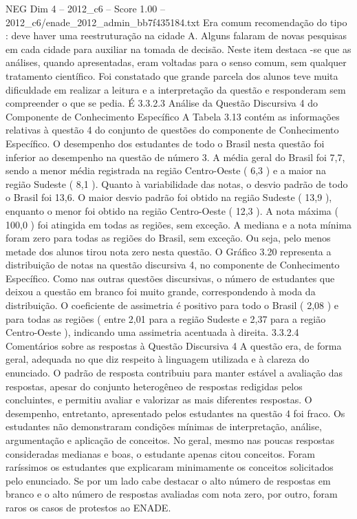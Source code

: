 \begin{textsample}{NEG Dim 4 – 2012\_c6 – Score 1.00 – 2012\_c6/enade\_2012\_admin\_bb7f435184.txt}
Era comum recomendação do tipo : deve haver uma reestruturação na cidade A.
Alguns falaram de novas pesquisas em cada cidade para auxiliar na tomada de decisão.
Neste item destaca -se que as análises, quando apresentadas, eram voltadas para o senso comum, sem qualquer tratamento científico.
Foi constatado que grande parcela dos alunos teve muita dificuldade em realizar a leitura e a interpretação da questão e responderam sem compreender o que se pedia.
É 3.3.2.3 Análise da Questão Discursiva 4 do Componente de Conhecimento Específico A Tabela 3.13 contém as informações relativas à questão 4 do conjunto de questões do componente de Conhecimento Específico.
O desempenho dos estudantes de todo o Brasil nesta questão foi inferior ao desempenho na questão de número 3.
A média geral do Brasil foi 7,7, sendo a menor média registrada na região Centro-Oeste ( 6,3 ) e a maior na região Sudeste ( 8,1 ).
Quanto à variabilidade das notas, o desvio padrão de todo o Brasil foi 13,6.
O maior desvio padrão foi obtido na região Sudeste ( 13,9 ), enquanto o menor foi obtido na região Centro-Oeste ( 12,3 ).
A nota máxima ( 100,0 ) foi atingida em todas as regiões, sem exceção.
A mediana e a nota mínima foram zero para todas as regiões do Brasil, sem exceção.
Ou seja, pelo menos metade dos alunos tirou nota zero nesta questão.
O Gráfico 3.20 representa a distribuição de notas na questão discursiva 4, no componente de Conhecimento Específico.
Como nas outras questões discursivas, o número de estudantes que deixou a questão em branco foi muito grande, correspondendo à moda da distribuição.
O coeficiente de assimetria é positivo para todo o Brasil ( 2,08 ) e para todas as regiões ( entre 2,01 para a região Sudeste e 2,37 para a região Centro-Oeste ), indicando uma assimetria acentuada à direita. 3.3.2.4 Comentários sobre as respostas à Questão Discursiva 4 A questão era, de forma geral, adequada no que diz respeito à linguagem utilizada e à clareza do enunciado.
O padrão de resposta contribuiu para manter estável a avaliação das respostas, apesar do conjunto heterogêneo de respostas redigidas pelos concluintes, e permitiu avaliar e valorizar as mais diferentes respostas.
O desempenho, entretanto, apresentado pelos estudantes na questão 4 foi fraco.
Os estudantes não demonstraram condições mínimas de interpretação, análise, argumentação e aplicação de conceitos.
No geral, mesmo nas poucas respostas consideradas medianas e boas, o estudante apenas citou conceitos.
Foram raríssimos os estudantes que explicaram minimamente os conceitos solicitados pelo enunciado.
Se por um lado cabe destacar o alto número de respostas em branco e o alto número de respostas avaliadas com nota zero, por outro, foram raros os casos de protestos ao ENADE.

\end{textsample}
